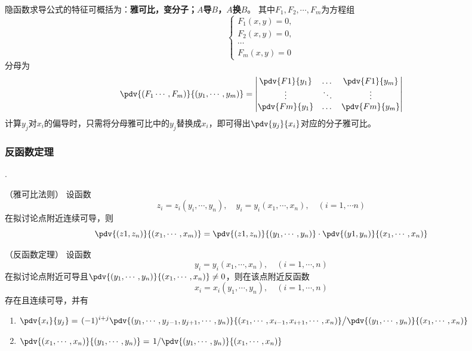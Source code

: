 隐函数求导公式的特征可概括为：\textbf{\textsf{雅可比，变分子；$A$导$B$，$A$换$B$}}。
其中$F_1,F_2,\cdots,F_m$为方程组
\[
    \begin{cases}
        F_1(x,y) = 0, \\
        F_2(x,y) = 0, \\
        \cdots        \\
        F_m(x,y) = 0
    \end{cases}
\]
分母为
\begin{equation}
    \pdv{(F_1\cdots,F_m)}{(y_1,\cdots,y_m)}
    =
    \begin{vmatrix}
        \pdv{ F1}{y_1} & \dots  & \pdv{ F1}{y_m} \\
        \vdots         & \ddots & \vdots         \\
        \pdv{ Fm}{y_1} & \dots  & \pdv{ Fm}{y_m}
    \end{vmatrix}
\end{equation}
计算$y_j$对$x_i$的偏导时，只需将分母雅可比中的$y_j$替换成$x_i$，即可得出$\displaystyle\pdv{y_j}{x_i}$对应的分子雅可比。

\subsubsection{反函数定理}
.
\begin{theorem}
    （雅可比法则）
    \label{th:雅可比法则}
    设函数
    \[ z_i = z_i(y_i,\cdots,y_n),\quad y_i=y_i(x_1,\cdots,x_n),\quad (i=1,\cdots n) \]
    在拟讨论点附近连续可导，则
    \[
        \pdv{(z1,z_n)}{(x_1,\cdots,x_m)}
        = \pdv{(z1,z_n)}{(y_1,\cdots,y_n)} \cdot \pdv{(y1,y_n)}{(x_1,\cdots,x_n)}
    \]
\end{theorem}

\begin{theorem}
    （反函数定理）
    \label{th:反函数定理}
    设函数
    \[ y_i=y_i(x_1,\cdots,x_n),\quad (i=1,\cdots,n) \]
    在拟讨论点附近可导且$\displaystyle\pdv{(y_1,\cdots,y_n)}{(x_1,\cdots,x_n)}\neq 0$，则在该点附近反函数
    \[ x_i = x_i(y_1,\cdots,y_n),\quad (i=1,\cdots,n) \]
    存在且连续可导，并有
    \begin{enumerate}[(1)]
        \item
              $
                  \displaystyle
                  \pdv{x_i}{y_j}
                  = \left.(-1)^{i+j} \pdv{(y_1,\cdots,y_{j-1},y_{j+1},\cdots,y_n)}{(x_1,\cdots,x_{i-1},x_{i+1},\cdots,x_n)}
                  \middle/
                  \pdv{(y_1,\cdots,y_n)}{(x_1,\cdots,x_n)}
                  \right.
              $
        \item
              $
                  \pdv{(x_1,\cdots,x_n)}{(y_1,\cdots,y_n)} = \left.1\middle/\pdv{(y_1,\cdots,y_n)}{(x_1,\cdots,x_n)}\right.
              $
    \end{enumerate}
\end{theorem}

